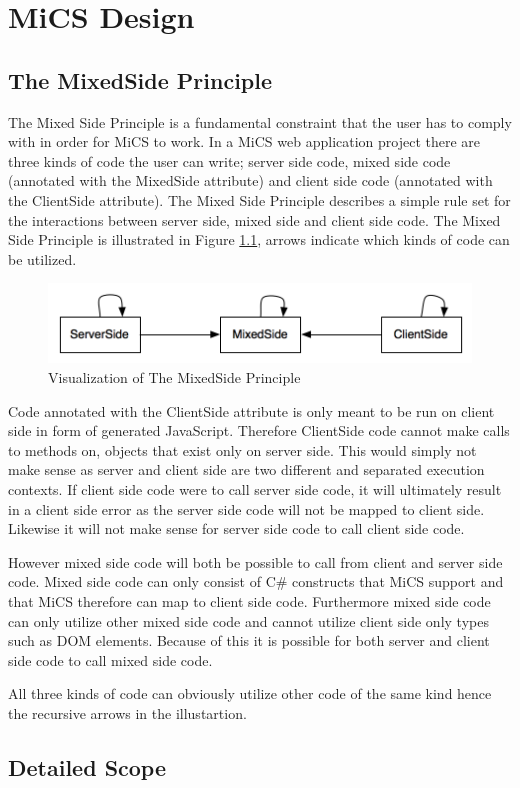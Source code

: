 \chapter{MiCS Design}

	\section{The MixedSide Principle} %
	\label{sub:the_mixedside_principle}
		The Mixed Side Principle is a fundamental constraint that the user has to comply with in order for MiCS to work. In a MiCS web application project there are three kinds of code the user can write; server side code, mixed side code (annotated with the MixedSide attribute) and client side code (annotated with the ClientSide attribute). The Mixed Side Principle describes a simple rule set for the interactions between server side, mixed side and client side code. The Mixed Side Principle is illustrated in Figure \ref{fig:MixedSidePrinciple}, arrows indicate which kinds of code can be utilized.

		\begin{figure}[H]
			\begin{center}
				\centerline{\includegraphics[width=12cm]{resources/images/MixedSidePrinciple.png}}
			\end{center}
			\caption{Visualization of The MixedSide Principle}
			\label{fig:MixedSidePrinciple}
		\end{figure}

		Code annotated with the ClientSide attribute is only meant to be run on client side in form of generated JavaScript. Therefore ClientSide code cannot make calls to methods on, objects that exist only on server side. This would simply not make sense as server and client side are two different and separated execution contexts.  If client side code were to call server side code, it will ultimately result in a client side error as the server side code will not be mapped to client side. Likewise it will not make sense for server side code to call client side code.

		However mixed side code will both be possible to call from client and server side code. Mixed side code can only consist of C\# constructs that MiCS support and that MiCS therefore can map to client side code. Furthermore mixed side code can only utilize other mixed side code and cannot utilize client side only types such as DOM elements. Because of this it is possible for both server and client side code to call mixed side code.

		All three kinds of code can obviously utilize other code of the same kind hence the recursive arrows in the illustartion.

		









\section{Detailed Scope}